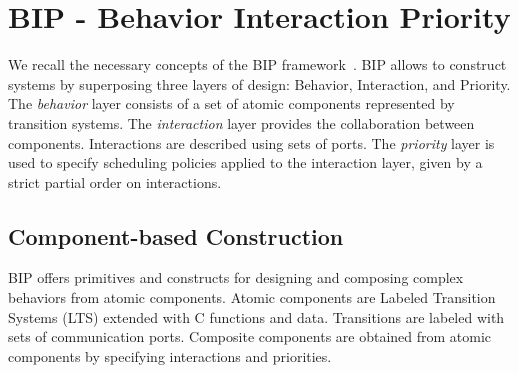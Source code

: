 \section{BIP - Behavior Interaction Priority}
\label{sec:bip}
%
We recall the necessary concepts of the BIP framework~\cite{bip11}.
BIP allows to construct systems by superposing three layers of design: Behavior, Interaction, and Priority.
The \emph{behavior} layer consists of a set of atomic components represented by transition systems. 
The \emph{interaction} layer provides the collaboration between components. 
Interactions are described using sets of ports. 
The \emph{priority} layer is used to specify scheduling policies applied to the interaction layer, given by a strict partial order on interactions.
%
\subsection{Component-based Construction}
%
BIP offers primitives and constructs for designing and composing complex behaviors from atomic components. Atomic components are Labeled Transition Systems (LTS) extended with C functions and data. Transitions are labeled with sets of communication ports. 
Composite components are obtained from atomic components by specifying interactions and priorities.
%
%

